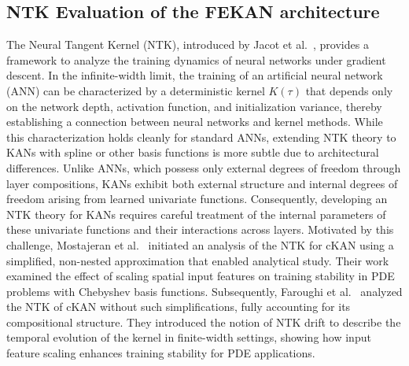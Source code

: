 \documentclass{article}
\begin{document}
\subsection{NTK Evaluation of the FEKAN architecture}
The Neural Tangent Kernel (NTK), introduced by Jacot et al.~\cite{jacot2018neural}, provides a framework to analyze the training dynamics of neural networks under gradient descent. In the infinite-width limit, the training of an artificial neural network (ANN) can be characterized by a deterministic kernel $K(\tau)$ that depends only on the network depth, activation function, and initialization variance, thereby establishing a connection between neural networks and kernel methods. While this characterization holds cleanly for standard ANNs, extending NTK theory to KANs with spline or other basis functions is more subtle due to architectural differences. Unlike ANNs, which possess only external degrees of freedom through layer compositions, KANs exhibit both external structure and internal degrees of freedom arising from learned univariate functions. Consequently, developing an NTK theory for KANs requires careful treatment of the internal parameters of these univariate functions and their interactions across layers. Motivated by this challenge, Mostajeran et al.~\cite{mostajeran2025scaled} initiated an analysis of the NTK for cKAN using a simplified, non-nested approximation that enabled analytical study. Their work examined the effect of scaling spatial input features on training stability in PDE problems with Chebyshev basis functions. Subsequently, Faroughi et al.~\cite{faroughi2025neural} analyzed the NTK of cKAN without such simplifications, fully accounting for its compositional structure. They introduced the notion of NTK drift to describe the temporal evolution of the kernel in finite-width settings, showing how input feature scaling enhances training stability for PDE applications.
\end{document}
